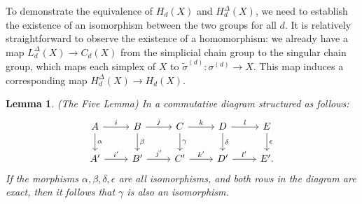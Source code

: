 \documentclass{amsart}
\newtheorem{lemma}[definition]{Lemma}
\begin{document}
To demonstrate the equivalence of $H_d(X)$ and $H^\Delta_d(X)$, we need to establish the existence of an isomorphism between the two groups for all $d$. It is relatively straightforward to observe the existence of a homomorphism: we already have a map $L^\Delta_d(X) \rightarrow C_d(X)$ from the simplicial chain group to the singular chain group, which maps each simplex of $X$ to $\tilde{\sigma}^{(d)}: \sigma^{(d)} \rightarrow X$. This map induces a corresponding map $H^\Delta_d(X) \rightarrow H_d(X)$.

\begin{lemma}{(The Five Lemma)}
\label{fivelemma}
In a commutative diagram structured as follows:
\begin{equation}
\begin{tikzcd}
A \arrow[r, "i"] \arrow[d, "\alpha"] & B \arrow[r, "j"] \arrow[d, "\beta"] & C \arrow[r, "k"] \arrow[d, "\gamma"] & D \arrow[r, "l"] \arrow[d, "\delta"] & E \arrow[d, "\epsilon"] \\
A' \arrow[r, "i'"]                               & B' \arrow[r, "j'"]                              & C' \arrow[r, "k'"]                               & D' \arrow[r, "l'"]                               & E'.                                 
\end{tikzcd}
\end{equation}
If the morphisms $\alpha, \beta, \delta, \epsilon$ are all isomorphisms, and both rows in the diagram are exact, then it follows that $\gamma$ is also an isomorphism.
\end{lemma}
\end{document}
